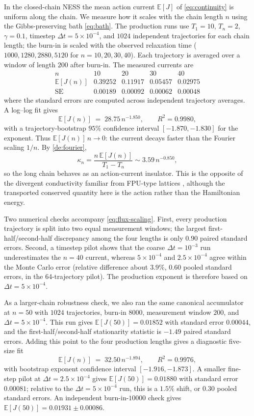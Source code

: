 \documentclass[11pt,a4paper]{article}
\theoremstyle{definition}
\newcommand{\E}{\mathbb{E}}
\numberwithin{equation}{section}   %
\begin{document}
In the closed-chain NESS the mean action current $\E[J]$ of
\eqref{eq:continuity} is uniform along the chain. We measure how it scales with
the chain length $n$ using the Gibbs-preserving bath \eqref{eq:bath}. The
production runs use $T_1=10$, $T_n=2$, $\gamma=0.1$, timestep
$\Delta t=5\times10^{-4}$, and $1024$ independent trajectories for each chain
length; the burn-in is scaled with the observed relaxation time
($1000,1280,2880,5120$ for $n=10,20,30,40$). Each trajectory is averaged over a
window of length $200$ after burn-in. The measured currents are
\[
\begin{array}{c|cccc}
n & 10 & 20 & 30 & 40\\ \hline
\E[J(n)] &
0.39252 & 0.11917 & 0.05457 & 0.02975\\
\mathrm{SE} &
0.00189 & 0.00092 & 0.00062 & 0.00048
\end{array}
\]
where the standard errors are computed across independent trajectory averages.
A log--log fit gives
\begin{equation}\label{eq:flux-scaling}
  \E[J(n)] \;=\; 28.75\,n^{-1.850},
  \qquad R^2=0.9980,
\end{equation}
with a trajectory-bootstrap $95\%$ confidence interval
$[-1.870,-1.830]$ for the exponent. Thus $\E[J(n)]\,n\to0$: the current decays
faster than the Fourier scaling $1/n$. By \cref{de:fourier},
\[
  \kappa_n=\frac{n\,\E[J(n)]}{T_1-T_n}
  \sim 3.59\,n^{-0.850},
\]
so the long chain behaves as an action-current insulator. This is the opposite
of the divergent conductivity familiar from FPU-type lattices
\cite{LepriLiviPoliti}, although the transported conserved quantity here is the
action rather than the Hamiltonian energy.

Two numerical checks accompany \eqref{eq:flux-scaling}. First, every production
trajectory is split into two equal measurement windows; the largest
first-half/second-half discrepancy among the four lengths is only $0.90$
paired standard errors. Second, a timestep pilot shows that the coarse
$\Delta t=10^{-3}$ run underestimates the $n=40$ current, whereas
$5\times10^{-4}$ and $2.5\times10^{-4}$ agree within the Monte Carlo error
(relative difference about $3.9\%$, $0.60$ pooled standard errors, in the
64-trajectory pilot). The production exponent is therefore based on
$\Delta t=5\times10^{-4}$.

As a larger-chain robustness check, we also ran the same canonical accumulator
at $n=50$ with $1024$ trajectories, burn-in $8000$, measurement window $200$,
and $\Delta t=5\times10^{-4}$. This run gives
$\E[J(50)]=0.01852$ with standard error $0.00044$, and the
first-half/second-half stationarity statistic is $-1.49$ paired standard
errors. Adding this point to the four production lengths gives a diagnostic
five-size fit
\[
  \E[J(n)] \;=\; 32.50\,n^{-1.894},
  \qquad R^2=0.9976,
\]
with bootstrap exponent confidence interval $[-1.916,-1.873]$. A smaller
fine-step pilot at $\Delta t=2.5\times10^{-4}$ gives
$\E[J(50)]=0.01880$ with standard error $0.00081$; relative to the
$\Delta t=5\times10^{-4}$ run, this is a $1.5\%$ shift, or $0.30$ pooled
standard errors. An independent burn-in-$10000$ check gives
$\E[J(50)]=0.01931\pm0.00086$.
\end{document}
